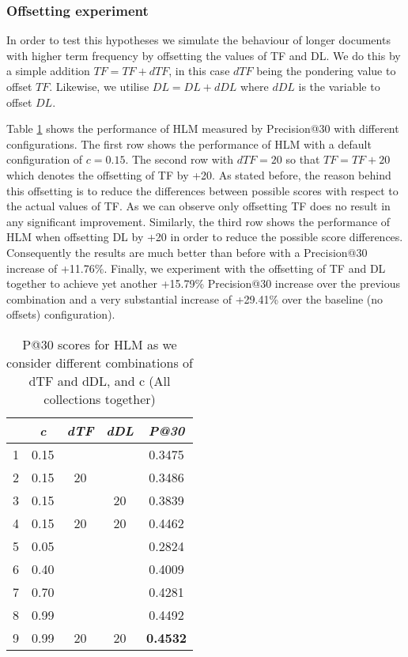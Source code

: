 \subsubsection{Offsetting experiment}
In order to test this hypotheses we simulate the behaviour of longer documents with higher term frequency by offsetting the values of TF and DL. We do this by a simple addition \(TF = TF+dTF\), in this case \(dTF\) being the pondering value to offset \(TF\). Likewise, we utilise \(DL = DL+dDL\) where \(dDL\) is the variable to offset \(DL\).

Table \ref{hlmOverestimates} shows the performance of HLM measured by Precision@30 with different configurations. The first row shows the performance of HLM with a default configuration of $c = 0.15$. The second row with $dTF = 20$ so that $TF = TF+20$ which denotes the offsetting of TF by +20. As stated before, the reason behind this offsetting is to reduce the differences between possible scores with respect to the actual values of TF. As we can observe only offsetting TF does no result in any significant improvement. Similarly, the third row shows the performance of HLM when offsetting DL by +20 in order to reduce the possible score differences. Consequently the results are much better than before with a Precision@30 increase of +11.76\%. Finally, we experiment with the offsetting of TF and DL together to achieve yet another +15.79\% Precision@30 increase over the previous combination and a very substantial increase of +29.41\% over the baseline (no offsets) configuration). 

\begin{table}[]

	\caption{P@30 scores for HLM as we consider different combinations of dTF and dDL, and c (All collections together)}
	\centering
	\begin{tabular}{l|c|c|c|c} 	
	\textit{\textbf{}} &
	\textit{\textbf{c}} & 
	\textit{\textbf{dTF}} & 
	\textit{\textbf{dDL}} & 
	\textit{\textbf{P@30}} 	
	\tabularnewline
	\hline
	1 & 0.15 &    &    & 0.3475\\
	2 & 0.15 & 20 &    & 0.3486\\
	3 & 0.15 &    & 20 & 0.3839 \\
	4 & 0.15 & 20 & 20 & 0.4462 \\
	\hline
	\hline
	5 & 0.05 &  &  & 0.2824 \\
	6 & 0.40 &  &  & 0.4009 \\
	7 & 0.70 &  &  & 0.4281 \\
	8 & 0.99 &  &  & 0.4492 \\
	\hline
    \hline
	9 & 0.99 & 20 & 20 & \textbf{0.4532} \\	
	\hline
	\end{tabular}
	\label{hlmOverestimates}
\end{table}


